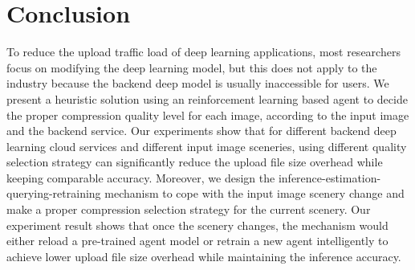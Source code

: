 \section{Conclusion}
\label{sec: conclusion}

To reduce the upload traffic load of deep learning applications, most researchers focus on modifying the deep learning model, but this does not apply to the industry because the backend deep model is usually inaccessible for users. We present a heuristic solution using an reinforcement learning based agent to decide the proper compression quality level for each image, according to the input image and the backend service. Our experiments show that for different backend deep learning cloud services and different input image sceneries, using different quality selection strategy can significantly reduce the upload file size overhead while keeping comparable accuracy. Moreover, we design the inference-estimation-querying-retraining mechanism to cope with the input image scenery change and make a proper compression selection strategy for the current scenery. Our experiment result shows that once the scenery changes, the mechanism would either reload a pre-trained agent model or retrain a new
agent intelligently to achieve lower upload file size overhead while maintaining the inference accuracy.
